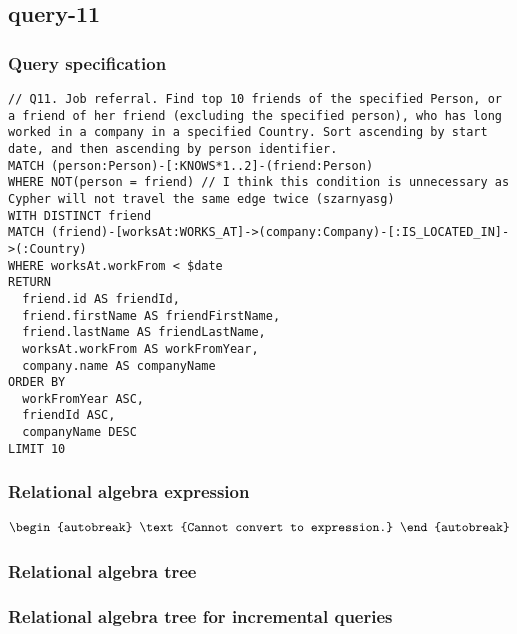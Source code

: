 \subsection{query-11}

\subsubsection*{Query specification}

\begin{lstlisting}
// Q11. Job referral. Find top 10 friends of the specified Person, or a friend of her friend (excluding the specified person), who has long worked in a company in a specified Country. Sort ascending by start date, and then ascending by person identifier.
MATCH (person:Person)-[:KNOWS*1..2]-(friend:Person)
WHERE NOT(person = friend) // I think this condition is unnecessary as Cypher will not travel the same edge twice (szarnyasg)
WITH DISTINCT friend
MATCH (friend)-[worksAt:WORKS_AT]->(company:Company)-[:IS_LOCATED_IN]->(:Country)
WHERE worksAt.workFrom < $date
RETURN
  friend.id AS friendId,
  friend.firstName AS friendFirstName,
  friend.lastName AS friendLastName,
  worksAt.workFrom AS workFromYear,
  company.name AS companyName
ORDER BY
  workFromYear ASC,
  friendId ASC,
  companyName DESC
LIMIT 10
\end{lstlisting}

\subsubsection*{Relational algebra expression}

\begin{align*}
\begin{autobreak}
\text{Cannot convert to expression.}
\end{autobreak}
\end{align*}

\subsubsection*{Relational algebra tree}


\subsubsection*{Relational algebra tree for incremental queries}

